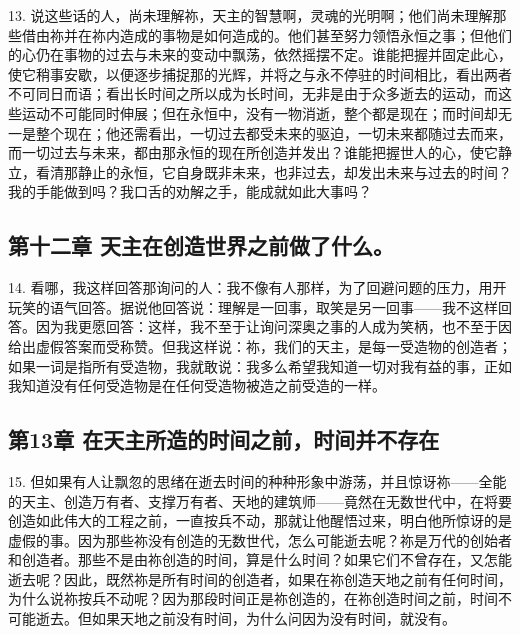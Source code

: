 13. 说这些话的人，尚未理解祢，天主的智慧啊，灵魂的光明啊；他们尚未理解那些借由祢并在祢内造成的事物是如何造成的。他们甚至努力领悟永恒之事；但他们的心仍在事物的过去与未来的变动中飘荡，依然摇摆不定。谁能把握并固定此心，使它稍事安歇，以便逐步捕捉那的光辉，并将之与永不停驻的时间相比，看出两者不可同日而语；看出长时间之所以成为长时间，无非是由于众多逝去的运动，而这些运动不可能同时伸展；但在永恒中，没有一物消逝，整个都是现在；而时间却无一是整个现在；他还需看出，一切过去都受未来的驱迫，一切未来都随过去而来，而一切过去与未来，都由那永恒的现在所创造并发出？谁能把握世人的心，使它静立，看清那静止的永恒，它自身既非未来，也非过去，却发出未来与过去的时间？我的手能做到吗？我口舌的劝解之手，能成就如此大事吗？\par


\subsection{第十二章 天主在创造世界之前做了什么。}

14. 看哪，我这样回答那询问的人：我不像有人那样，为了回避问题的压力，用开玩笑的语气回答。据说他回答说：理解是一回事，取笑是另一回事——我不这样回答。因为我更愿回答：这样，我不至于让询问深奥之事的人成为笑柄，也不至于因给出虚假答案而受称赞。但我这样说：祢，我们的天主，是每一受造物的创造者；如果一词是指所有受造物，我就敢说：我多么希望我知道一切对我有益的事，正如我知道没有任何受造物是在任何受造物被造之前受造的一样。\par


\subsection{第13章 在天主所造的时间之前，时间并不存在}

15. 但如果有人让飘忽的思绪在逝去时间的种种形象中游荡，并且惊讶祢——全能的天主、创造万有者、支撑万有者、天地的建筑师——竟然在无数世代中，在将要创造如此伟大的工程之前，一直按兵不动，那就让他醒悟过来，明白他所惊讶的是虚假的事。因为那些祢没有创造的无数世代，怎么可能逝去呢？祢是万代的创始者和创造者。那些不是由祢创造的时间，算是什么时间？如果它们不曾存在，又怎能逝去呢？因此，既然祢是所有时间的创造者，如果在祢创造天地之前有任何时间，为什么说祢按兵不动呢？因为那段时间正是祢创造的，在祢创造时间之前，时间不可能逝去。但如果天地之前没有时间，为什么问因为没有时间，就没有。\par

